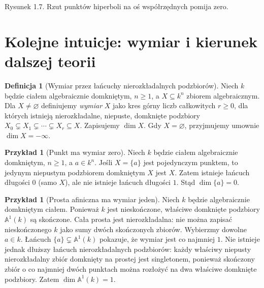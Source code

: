 \documentclass[11pt,a4paper,openany]{report}
\numberwithin{equation}{section}
\theoremstyle{plain}
\theoremstyle{definition}
\newtheorem{definicja}[twierdzenie]{Definicja}
\newtheorem{przyklad}[twierdzenie]{Przykład}
\theoremstyle{remark}
\newcommand{\A}{\mathbb A}
\begin{document}
\begin{center}
\end{center}
\begin{center}\small Rysunek 1.7. Rzut punktów hiperboli na oś współrzędnych pomija zero.\end{center}

\section{Kolejne intuicje: wymiar i kierunek dalszej teorii}

\begin{definicja}[Wymiar przez łańcuchy nierozkładalnych podzbiorów]
Niech $k$ będzie ciałem algebraicznie domkniętym,
$n\ge1$, a $X\subseteq k^n$ zbiorem algebraicznym.
Dla $X\ne\varnothing$ definiujemy \emph{wymiar} $X$ jako kres górny liczb
całkowitych $r\ge0$, dla których istnieją
nierozkładalne, niepuste, domknięte podzbiory
$X_0\subsetneq X_1\subsetneq\cdots\subsetneq X_r\subseteq X$.
Zapisujemy $\dim X$. Gdy $X=\varnothing$, przyjmujemy
umownie $\dim X=-\infty$.
\end{definicja}

\begin{przyklad}[Punkt ma wymiar zero]
Niech $k$ będzie ciałem algebraicznie domkniętym,
$n\ge1$, a $a\in k^n$. Jeśli $X=\{a\}$ jest pojedynczym punktem, to jedynym
niepustym podzbiorem domkniętym $X$ jest $X$.
Zatem istnieje łańcuch długości $0$ (samo $X$),
ale nie istnieje łańcuch długości $1$.
Stąd $\dim\{a\}=0$.
\end{przyklad}

\begin{przyklad}[Prosta afiniczna ma wymiar jeden]
Niech $k$ będzie algebraicznie domkniętym ciałem.
Ponieważ $k$ jest nieskończone, właściwe domknięte
podzbiory $\A^1(k)$ są skończone.
Cała prosta jest nierozkładalna: nie można zapisać
nieskończonego $k$ jako sumy dwóch skończonych zbiorów.
Wybierzmy dowolne $a\in k$. Łańcuch
$\{a\}\subsetneq\A^1(k)$ pokazuje, że wymiar jest co najmniej $1$.
Nie istnieje jednak dłuższy łańcuch nierozkładalnych
podzbiorów: każdy właściwy niepusty nierozkładalny zbiór
domknięty na prostej jest singletonem, ponieważ skończony
zbiór o co najmniej dwóch punktach można rozłożyć na dwa
właściwe domknięte podzbiory.
Zatem $\dim\A^1(k)=1$.
\end{przyklad}
\end{document}
